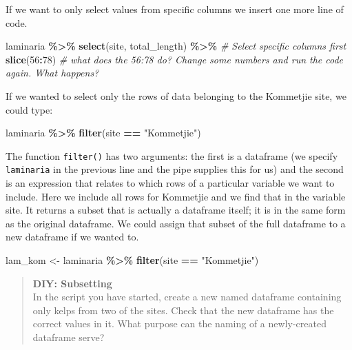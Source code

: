 \documentclass[
]{book}
\newenvironment{Shaded}{\begin{snugshade}}{\end{snugshade}}
\newcommand{\CommentTok}[1]{\textcolor[rgb]{0.56,0.35,0.01}{\textit{#1}}}
\newcommand{\DecValTok}[1]{\textcolor[rgb]{0.00,0.00,0.81}{#1}}
\newcommand{\KeywordTok}[1]{\textcolor[rgb]{0.13,0.29,0.53}{\textbf{#1}}}
\newcommand{\NormalTok}[1]{#1}
\newcommand{\OperatorTok}[1]{\textcolor[rgb]{0.81,0.36,0.00}{\textbf{#1}}}
\newcommand{\StringTok}[1]{\textcolor[rgb]{0.31,0.60,0.02}{#1}}
\begin{document}
If we want to only select values from specific columns we insert one more line of code.

\begin{Shaded}
\begin{Highlighting}[]
\NormalTok{laminaria }\OperatorTok{\%>\%}\StringTok{ }
\StringTok{  }\KeywordTok{select}\NormalTok{(site, total\_length) }\OperatorTok{\%>\%}\StringTok{ }\CommentTok{\# Select specific columns first}
\StringTok{  }\KeywordTok{slice}\NormalTok{(}\DecValTok{56}\OperatorTok{:}\DecValTok{78}\NormalTok{)}
\CommentTok{\# what does the \textquotesingle{}56:78\textquotesingle{} do? Change some numbers and run the code again. What happens?}
\end{Highlighting}
\end{Shaded}

If we wanted to select only the rows of data belonging to the Kommetjie site, we could type:

\begin{Shaded}
\begin{Highlighting}[]
\NormalTok{laminaria }\OperatorTok{\%>\%}
\StringTok{  }\KeywordTok{filter}\NormalTok{(site }\OperatorTok{==}\StringTok{ "Kommetjie"}\NormalTok{)}
\end{Highlighting}
\end{Shaded}

The function \texttt{filter()} has two arguments: the first is a dataframe (we specify \texttt{laminaria} in the previous line and the pipe supplies this for us) and the second is an expression that relates to which rows of a particular variable we want to include. Here we include all rows for Kommetjie and we find that in the variable site. It returns a subset that is actually a dataframe itself; it is in the same form as the original dataframe. We could assign that subset of the full dataframe to a new dataframe if we wanted to.

\begin{Shaded}
\begin{Highlighting}[]
\NormalTok{lam\_kom <{-}}\StringTok{ }\NormalTok{laminaria }\OperatorTok{\%>\%}\StringTok{ }
\StringTok{  }\KeywordTok{filter}\NormalTok{(site }\OperatorTok{==}\StringTok{ "Kommetjie"}\NormalTok{)}
\end{Highlighting}
\end{Shaded}

\begin{quote}
\textbf{DIY: Subsetting}\\
In the script you have started, create a new named dataframe containing only kelps from two of the sites. Check that the new dataframe has the correct values in it. What purpose can the naming of a newly-created dataframe serve?
\end{quote}
\end{document}
